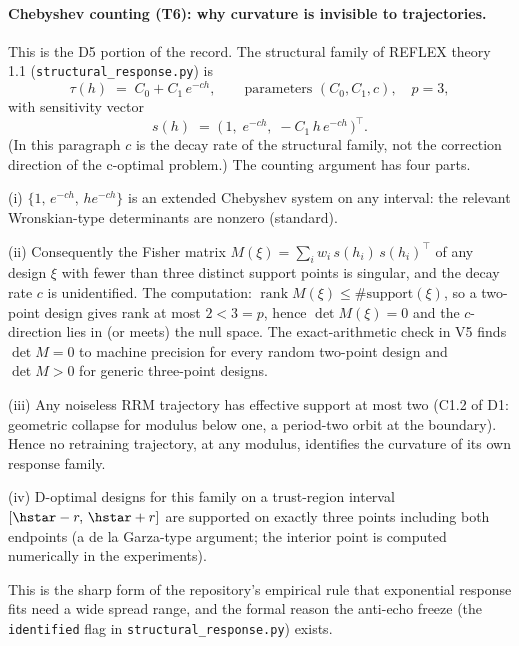 \paragraph{Chebyshev counting (T6): why curvature is invisible to
trajectories.}
This is the D5 portion of the record. The structural family of REFLEX
theory 1.1 (\texttt{structural\_response.py}) is
\begin{equation*}
\tau(h) \;=\; C_0 + C_1\, e^{-c h},
\qquad \text{parameters } (C_0, C_1, c), \quad p = 3,
\end{equation*}
with sensitivity vector
\begin{equation*}
s(h) \;=\; \big(\,1,\; e^{-c h},\; -C_1\, h\, e^{-c h}\,\big)^{\!\top}.
\end{equation*}
(In this paragraph $c$ is the decay rate of the structural family, not the
correction direction of the c-optimal problem.) The counting argument has
four parts.

(i) $\{1,\, e^{-ch},\, h e^{-ch}\}$ is an extended Chebyshev system on any
interval: the relevant Wronskian-type determinants are nonzero (standard).

(ii) Consequently the Fisher matrix
$M(\xi) = \sum_i w_i\, s(h_i)\, s(h_i)^\top$ of any design $\xi$ with fewer
than three distinct support points is singular, and the decay rate $c$ is
unidentified. The computation: $\operatorname{rank} M(\xi) \le
\#\mathrm{support}(\xi)$, so a two-point design gives rank at most
$2 < 3 = p$, hence $\det M(\xi) = 0$ and the $c$-direction lies in (or
meets) the null space. The exact-arithmetic check in V5 finds
$\det M = 0$ to machine precision for every random two-point design and
$\det M > 0$ for generic three-point designs.

(iii) Any noiseless RRM trajectory has effective support at most two
(C1.2 of D1: geometric collapse for modulus below one, a period-two orbit
at the boundary). Hence no retraining trajectory, at any modulus,
identifies the curvature of its own response family.

(iv) D-optimal designs for this family on a trust-region interval
$[\hstar - r,\, \hstar + r]$ are supported on exactly three points
including both endpoints (a de la Garza-type argument; the interior point
is computed numerically in the experiments).

This is the sharp form of the repository's empirical rule that exponential
response fits need a wide spread range, and the formal reason the
anti-echo freeze (the \texttt{identified} flag in
\texttt{structural\_response.py}) exists.

